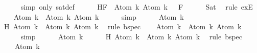 \begin{isabellebody}
\ \ \ \ \isamarkupfalse%
\ {\isacharparenleft}simp\ only{\isacharcolon}\ sat{\isacharunderscore}def{\isacharparenright}\isanewline
\ \ \isamarkupfalse%
\ {\isasymA}\ \ H{\isacharcolon}{\isachardoublequoteopen}{\isasymforall}F\ {\isasymin}\ {\isacharbraceleft}Atom\ k{\isacharcomma}\ \isactrlbold {\isasymnot}{\isacharparenleft}Atom\ k{\isacharparenright}{\isacharbraceright}{\isachardot}\ {\isasymA}\ {\isasymTurnstile}\ F{\isachardoublequoteclose}\isanewline
\ \ \ \ \isamarkupfalse%
\ Sat\ \isamarkupfalse%
\ {\isacharparenleft}rule\ exE{\isacharparenright}\isanewline
\ \ \isamarkupfalse%
\ {\isachardoublequoteopen}Atom\ k\ {\isasymin}\ {\isacharbraceleft}Atom\ k{\isacharcomma}\ \isactrlbold {\isasymnot}{\isacharparenleft}Atom\ k{\isacharparenright}{\isacharbraceright}{\isachardoublequoteclose}\isanewline
\ \ \ \ \isamarkupfalse%
\ simp\isanewline
\ \ \isamarkupfalse%
\ {\isachardoublequoteopen}{\isasymA}\ {\isasymTurnstile}\ Atom\ k{\isachardoublequoteclose}\isanewline
\ \ \ \ \isamarkupfalse%
\ H\ {\isacartoucheopen}Atom\ k\ {\isasymin}\ {\isacharbraceleft}Atom\ k{\isacharcomma}\ \isactrlbold {\isasymnot}{\isacharparenleft}Atom\ k{\isacharparenright}{\isacharbraceright}{\isacartoucheclose}\ \isamarkupfalse%
\ {\isacharparenleft}rule\ bspec{\isacharparenright}\isanewline
\ \ \isamarkupfalse%
\ {\isachardoublequoteopen}\isactrlbold {\isasymnot}{\isacharparenleft}Atom\ k{\isacharparenright}\ {\isasymin}\ {\isacharbraceleft}Atom\ k{\isacharcomma}\ \isactrlbold {\isasymnot}{\isacharparenleft}Atom\ k{\isacharparenright}{\isacharbraceright}{\isachardoublequoteclose}\isanewline
\ \ \ \ \isamarkupfalse%
\ simp\isanewline
\ \ \isamarkupfalse%
\ {\isachardoublequoteopen}{\isasymA}\ {\isasymTurnstile}\ \isactrlbold {\isasymnot}{\isacharparenleft}Atom\ k{\isacharparenright}{\isachardoublequoteclose}\isanewline
\ \ \ \ \isamarkupfalse%
\ H\ {\isacartoucheopen}\isactrlbold {\isasymnot}{\isacharparenleft}Atom\ k{\isacharparenright}\ {\isasymin}\ {\isacharbraceleft}Atom\ k{\isacharcomma}\ \isactrlbold {\isasymnot}{\isacharparenleft}Atom\ k{\isacharparenright}{\isacharbraceright}{\isacartoucheclose}\ \isamarkupfalse%
\ {\isacharparenleft}rule\ bspec{\isacharparenright}\isanewline
\ \ \isamarkupfalse%
\ \isamarkupfalse%
\ {\isachardoublequoteopen}{\isasymnot}\ {\isasymA}\ {\isasymTurnstile}\ Atom\ k{\isachardoublequoteclose}\ \isanewline

\end{isabellebody}
